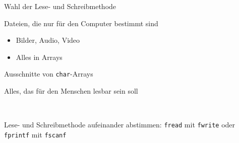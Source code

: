 
\begin{frame}{Wahl der Lese- und Schreibmethode}
%
%
\begin{itembox}
\item Dateien, die nur für den Computer bestimmt sind
	\begin{itemize}
	\item Bilder, Audio, Video
	\item Alles in Arrays
	\end{itemize}
\item Ausschnitte von \texttt{char}-Arrays
\end{itembox}
%
\begin{itembox}
\item Alles, das für den Menschen lesbar sein soll
\end{itembox}
%
\begin{tiny}
\\
\end{tiny}
%
%
\begin{hintbox}
Lese- und Schreibmethode aufeinander abstimmen: \texttt{fread} mit \texttt{fwrite} oder \texttt{fprintf} mit \texttt{fscanf}
\end{hintbox}
%
\end{frame}


